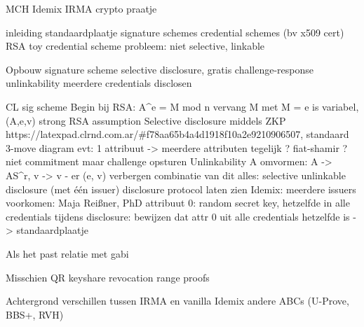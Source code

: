 



MCH Idemix IRMA crypto praatje

inleiding
  standaardplaatje
  signature schemes
  credential schemes (bv x509 cert)
    RSA toy credential scheme
    probleem: niet selective, linkable

Opbouw
  signature scheme
  selective disclosure, gratis challenge-response
  unlinkability
  meerdere credentials disclosen

CL sig scheme
  Begin bij RSA: A^e = M mod n
  vervang M met M = 
  e is variabel, (A,e,v)
  strong RSA assumption
Selective disclosure
  middels ZKP
  https://latexpad.clrnd.com.ar/#f78aa65b4a4d1918f10a2e9210906507, standaard 3-move diagram
  evt: 1 attribuut -> meerdere attributen tegelijk
  ? fiat-shamir
  ? niet commitment maar challenge opsturen
Unlinkability
  A omvormen: A -> AS^r,  v -> v - er
  (e, v) verbergen
combinatie van dit alles: selective unlinkable disclosure (met één issuer)
  disclosure protocol laten zien
Idemix: meerdere issuers
  voorkomen: Maja Reißner, PhD
  attribuut 0: random secret key, hetzelfde in alle credentials
  tijdens disclosure: bewijzen dat attr 0 uit alle credentials hetzelfde is
-> standaardplaatje

Als het past
  relatie met gabi

Misschien
  QR
  keyshare
  revocation
  range proofs

Achtergrond
  verschillen tussen IRMA en vanilla Idemix
  andere ABCs (U-Prove, BBS+, RVH)

